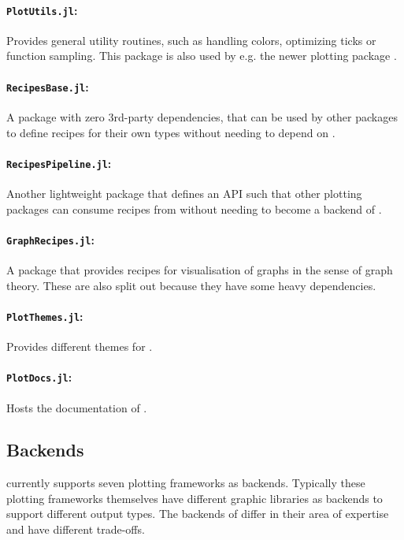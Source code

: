 \documentclass[a4paper]{article}
\begin{document}
\paragraph{\texttt{PlotUtils.jl}:} Provides general utility routines, such as handling colors, optimizing ticks or function sampling. This package is also used by e.g. the newer plotting package .

\paragraph{\texttt{RecipesBase.jl}:} A package with zero 3rd-party dependencies, that can be used by other packages to define recipes for their own types without needing to depend on \Plots.

\paragraph{\texttt{RecipesPipeline.jl}:} Another lightweight package that defines an API such that other plotting packages can consume recipes from \RecipesBase without needing to become a backend of \Plots.

\paragraph{\texttt{GraphRecipes.jl}:} A package that provides recipes for visualisation of graphs in the sense of graph theory.
These are also split out because they have some heavy dependencies.

\paragraph{\texttt{PlotThemes.jl}:} Provides different themes for \Plots.

\paragraph{\texttt{PlotDocs.jl}:} Hosts the documentation of \Plots.



\subsection*{Backends}

\Plots currently supports seven plotting frameworks as backends.
Typically these plotting frameworks themselves have different graphic libraries as backends to support different output types.
The backends of \Plots differ in their area of expertise and have different trade-offs.
\end{document}
